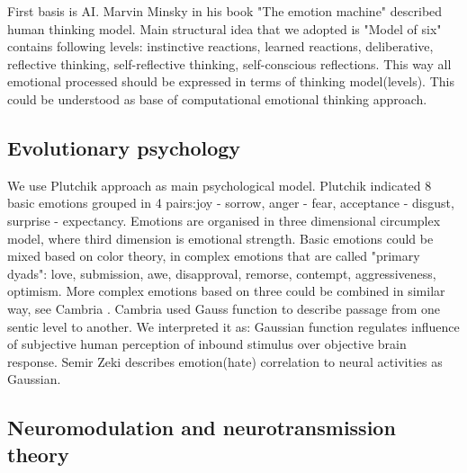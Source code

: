 First basis is  AI. Marvin Minsky in his book "The emotion machine"\cite{emotionmachine} described human thinking model. Main structural idea that we adopted is "Model of six" contains following levels: instinctive reactions, learned reactions, deliberative, reflective thinking, self-reflective thinking, self-conscious reflections. This way all emotional processed should be expressed in terms of thinking model(levels). This could be understood as base of computational emotional thinking approach.

\subsection{Evolutionary psychology}

We use Plutchik approach\cite{natureofemotions} as main psychological model. Plutchik indicated 8 basic emotions grouped in 4 pairs:joy - sorrow, anger - fear, acceptance - disgust, surprise - expectancy.
Emotions are organised in three dimensional circumplex model, where third dimension is emotional strength. Basic emotions could be mixed based on color theory, in complex emotions that are called "primary dyads": love, submission, awe, disapproval, remorse, contempt, aggressiveness, optimism. More complex emotions based on three could be combined in similar way, see Cambria \cite{senticcomputing}. Cambria \cite{hourglass} used Gauss function to describe passage from one sentic level to another. We interpreted it as: Gaussian function regulates influence of subjective human perception of inbound stimulus over objective brain response. Semir Zeki\cite{neuralcorrelatesofhate} describes emotion(hate) correlation to neural activities as Gaussian.

\subsection{Neuromodulation and neurotransmission theory}

